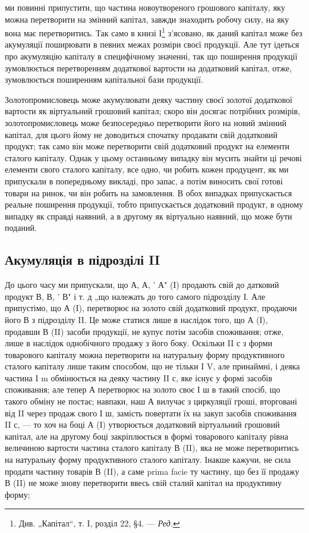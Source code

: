\parcont{}  %
ми повинні припустити, що частина новоутвореного грошового капіталу,
яку можна перетворити на змінний капітал, завжди знаходить робочу
силу, на яку вона має перетворитись. Так само в книзі І\footnote*{
Див. „Капітал“, т. I, розділ 22, §4. — \emph{Ред.}
} з’ясовано,
як даний капітал може без акумуляції поширювати в певних межах розміри
своєї продукції. Але тут ідеться про акумуляцію капіталу в специфічному
значенні, так що поширення продукції зумовлюється перетворенням
додаткової вартости на додатковий капітал, отже, зумовлюється
поширенням капітальної бази продукції.

Золотопромисловець може акумулювати деяку частину своєї золотої
додаткової вартости як віртуальний грошовий капітал; скоро він досягає
потрібних розмірів, золотопромисловець може безпосередньо перетворити
його на новий змінний капітал, для цього йому не доводиться спочатку
продавати свій додатковий продукт; так само він може перетворити свій
додатковий продукт на елементи сталого капіталу. Однак у цьому останньому
випадку він мусить знайти ці речові елементи свого сталого капіталу,
все одно, чи робить кожен продуцент, як ми припускали в попередньому
викладі, про запас, а потім виносить свої готові товари на ринок,
чи він робить на замовлення. В обох випадках припускається реальне
поширення продукції, тобто припускається додатковий продукт, в
одному випадку як справді наявний, а в другому як віртуально наявний,
що може бути поданий.

\subsection{Акумуляція в підрозділі II}

До цього часу ми припускали, що А, А, ' А" (І) продають свій до
датковий продукт В, В, ' В" і т. д „що належать до того самого підрозділу
І. Але припустімо, що А (І), перетворює на золото свій додатковий
продукт, продаючи його В з підрозділу II. Це може статися
лише в наслідок того, що А (І), продавши В (II) засоби продукції,
не купує потім засобів споживання; отже, лише в наслідок однобічного
продажу з його боку. Оскільки II с з форми товарового капіталу можна
перетворити на натуральну форму продуктивного сталого капіталу лише
таким способом, що не тільки I V, але принаймні, і деяка частина I m
обмінюється на деяку частину II с, яке існує у формі засобів споживання;
але тепер А перетворює на золото своє І ш в такий спосіб, що такого
обміну не постає; навпаки, наш А вилучає з циркуляції гроші, вторговані
від II через продаж свого І ш, замість повертати їх на закуп засобів
споживання II с, — то хоч на боці А (І) утворюється додатковий
віртуальний грошовий капітал, але на другому боці закріплюється в формі
товарового капіталу рівна величиною вартости частина сталого капіталу
В (II), яка не може перетворитись на натуральну форму продуктивного
сталого капіталу. Інакше кажучи, не сила продати частину товарів
В (II), а саме prima facie ту частину, що без її продажу В (II) не може
знову перетворити ввесь свій сталий капітал на продуктивну форму;
\parbreak{}  %
